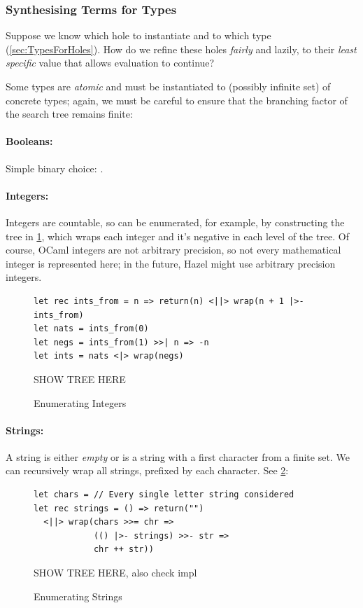 \subsubsection{Synthesising Terms for Types}
Suppose we know which hole to instantiate and to which type (\cref{sec:TypesForHoles}). How do we refine these holes \textit{fairly} and lazily, to their \textit{least specific} value that allows evaluation to continue?

Some types are \textit{atomic} and must be instantiated to (possibly infinite set) of concrete types; again, we must be careful to ensure that the branching factor of the search tree remains finite:

\paragraph{Booleans:} Simple binary choice: .
\paragraph{Integers:} Integers are countable, so can be enumerated, for example, by constructing the tree in \cref{fig:Integers}, which wraps each integer and it's negative in each level of the tree. Of course, OCaml integers are not arbitrary precision, so not every mathematical integer is represented here; in the future, Hazel might use arbitrary precision integers.
\begin{figure}[h]
\begin{verbatim}
let rec ints_from = n => return(n) <||> wrap(n + 1 |>- ints_from)
let nats = ints_from(0)
let negs = ints_from(1) >>| n => -n
let ints = nats <|> wrap(negs) 
\end{verbatim}
SHOW TREE HERE
\caption{Enumerating Integers}
\label{fig:Integers}
\end{figure}
 
\paragraph{Strings:} A string is either \textit{empty} or is a string with a first character from a finite set. We can recursively wrap all strings, prefixed by each character. See \cref{fig:Strings}:
\begin{figure}[h]
\begin{verbatim}
let chars = // Every single letter string considered
let rec strings = () => return("") 
  <||> wrap(chars >>= chr => 
            (() |>- strings) >>- str => 
            chr ++ str)) 
\end{verbatim}
SHOW TREE HERE, also check impl
\caption{Enumerating Strings}
\label{fig:Strings}
\end{figure}

